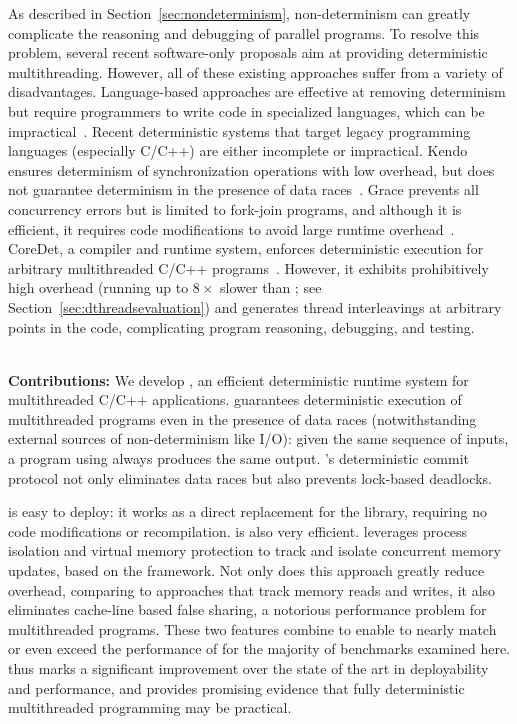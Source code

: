 
\label{chapter:dthreads}

As described in Section~\ref{sec:nondeterminism}, non-determinism can greatly complicate the reasoning and debugging of parallel programs. To resolve this problem, several recent software-only proposals aim at providing deterministic multithreading. However, all of these existing approaches suffer from a variety of disadvantages. Language-based approaches are effective at removing determinism but require programmers to write code in specialized languages, which can be impractical~\cite{Bocchino:2009:TES:1640089.1640097,Burckhardt:2010:CPR:1869459.1869515,Simpson:1999:SEE:330346.330357}. Recent deterministic systems that target legacy programming languages (especially C/C++) are either incomplete or impractical. Kendo ensures determinism of synchronization operations with low overhead, but does not guarantee determinism in the presence of data races~\cite{1508256}. Grace prevents all concurrency errors but is limited to fork-join programs, and although it is efficient, it requires code modifications to avoid large runtime overhead~\cite{grace}. CoreDet, a compiler and runtime system, enforces deterministic execution for arbitrary multithreaded C/C++ programs~\cite{Bergan:2010:CCR:1736020.1736029}. However, it exhibits prohibitively high overhead (running up to $8\times$ slower than \pthreads{}; see Section~\ref{sec:dthreadsevaluation}) and generates thread interleavings at arbitrary points in the code, complicating program reasoning, debugging, and testing.

\hspace{1em} \\
\noindent
\textbf{Contributions:}
We develop \textbf{\dthreads{}}, an efficient deterministic runtime system for multithreaded C/C++ applications. \dthreads{} guarantees deterministic execution of multithreaded programs even in the presence of data races (notwithstanding external sources of non-determinism like I/O): given the same sequence of inputs, a program using \dthreads{} always produces the same output. \dthreads{}'s deterministic commit protocol not only eliminates data races but also prevents lock-based deadlocks.

\dthreads{} is easy to deploy: it works as a direct replacement for the \pthreads{} library, requiring no code modifications or
recompilation. \dthreads{} is also very efficient. \dthreads{} leverages process isolation and virtual memory protection to track and isolate concurrent memory updates, based on the\sheriff{} framework. Not only does this approach greatly reduce overhead, comparing to approaches that track memory reads and writes, it also eliminates cache-line based false sharing, a notorious performance problem for multithreaded
programs. These two features combine to enable \dthreads{} to nearly match or even exceed the performance of \pthreads{} for the majority of benchmarks examined here. \dthreads{} thus marks a significant improvement over the state of the art in deployability and performance, and provides promising evidence that fully deterministic multithreaded programming may be practical.

